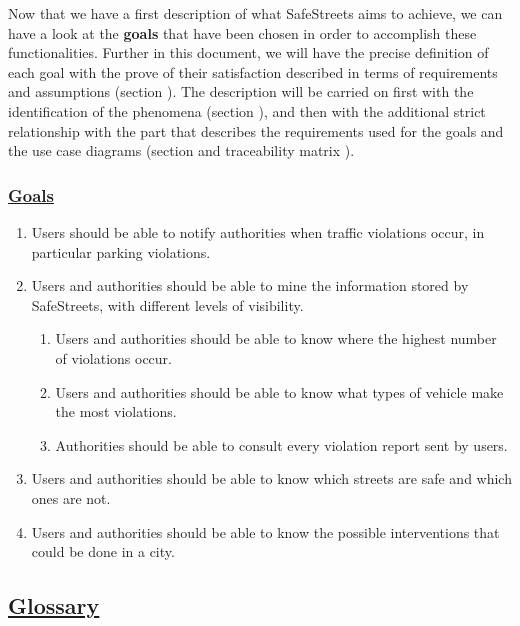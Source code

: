 	 Now that we have a first description of what SafeStreets aims to achieve, we can have a look at the \textbf{goals} that have been chosen in order to accomplish these functionalities. Further in this document, we will have the precise definition of each goal with the prove of their satisfaction described in terms of requirements and assumptions (section ). The description will be carried on first with the identification of the phenomena (section ), and then with the additional strict relationship with the part that describes the requirements used for the goals and the use case diagrams (section  and traceability matrix ). 
	
	\subsubsection[Goals]{\hyperlink{toc}{Goals}}
		\label{sec:goals}
		\begin{enumerate}[label=\textbf{G\arabic*}]
			\item \label{goal:notification} Users should be able to notify authorities when traffic violations occur, in particular parking violations.
			\item \label{goal:mining} Users and authorities should be able to mine the information stored by SafeStreets, with different levels of visibility.
				\begin{enumerate}[label=\textbf{G2\Alph*}]
					\item \label{goal:miningA} Users and authorities should be able to know where the highest number of violations occur.
					\item \label{goal:miningB} Users and authorities should be able to know what types of vehicle make the most violations.
					\item \label{goal:miningC} Authorities should be able to consult every violation report sent by users.
				\end{enumerate}
			\item \label{goal:safety} Users and authorities should be able to know which streets are safe and which ones are not.
			\item \label{goal:intervention} Users and authorities should be able to know the possible interventions that could be done in a city.
		\end{enumerate}
	
\subsection[Glossary]{\hyperlink{toc}{Glossary}}
	\label{sec:glossary}
	
